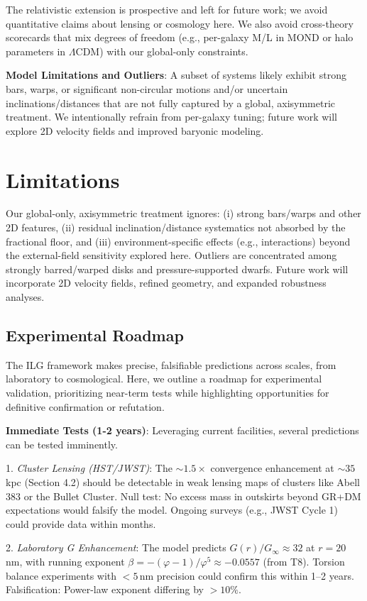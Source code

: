 \documentclass[12pt,a4paper]{article}
\begin{document}
The relativistic extension is prospective and left for future work; we avoid quantitative claims about lensing or cosmology here. We also avoid cross-theory scorecards that mix degrees of freedom (e.g., per-galaxy M/L in MOND or halo parameters in $\Lambda$CDM) with our global-only constraints.

\textbf{Model Limitations and Outliers}: A subset of systems likely exhibit strong bars, warps, or significant non-circular motions and/or uncertain inclinations/distances that are not fully captured by a global, axisymmetric treatment. We intentionally refrain from per-galaxy tuning; future work will explore 2D velocity fields and improved baryonic modeling.

\section{Limitations}
\noindent Our global-only, axisymmetric treatment ignores: (i) strong bars/warps and other 2D features, (ii) residual inclination/distance systematics not absorbed by the fractional floor, and (iii) environment-specific effects (e.g., interactions) beyond the external-field sensitivity explored here. Outliers are concentrated among strongly barred/warped disks and pressure-supported dwarfs. Future work will incorporate 2D velocity fields, refined geometry, and expanded robustness analyses.

\subsection{Experimental Roadmap}

The ILG framework makes precise, falsifiable predictions across scales, from laboratory to cosmological. Here, we outline a roadmap for experimental validation, prioritizing near-term tests while highlighting opportunities for definitive confirmation or refutation.

\textbf{Immediate Tests (1-2 years)}: Leveraging current facilities, several predictions can be tested imminently.

1. \emph{Cluster Lensing (HST/JWST)}: The $\sim 1.5\times$ convergence enhancement at $\sim 35$\,kpc (Section 4.2) should be detectable in weak lensing maps of clusters like Abell 383 or the Bullet Cluster. Null test: No excess mass in outskirts beyond GR+DM expectations would falsify the model. Ongoing surveys (e.g., JWST Cycle 1) could provide data within months.

2. \emph{Laboratory G Enhancement}: The model predicts $G(r)/G_\infty \approx 32$ at $r=20$\,nm, with running exponent $\beta = -(\varphi-1)/\varphi^5 \approx -0.0557$ (from T8). Torsion balance experiments with $<5$\,nm precision could confirm this within 1--2 years. Falsification: Power-law exponent differing by $>10\%$.
\end{document}

